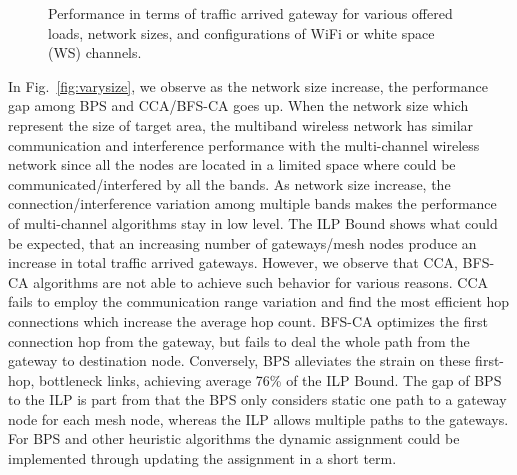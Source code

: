 \begin{figure}[t]
\centering
{}
\hfill
\caption{Performance in terms of traffic arrived gateway for various offered loads, network sizes, and configurations of WiFi or white space (WS) channels.}
\label{fig:all3figs}
\vspace{-0.1in}
\end{figure}

In Fig.~\ref{fig:varysize}, we observe as the network size increase, the performance
gap among BPS and CCA/BFS-CA goes up. When the network size which represent the size 
of target area, the multiband wireless network has similar communication and interference 
performance with the multi-channel wireless network since all the nodes are located in a 
limited space where could be communicated/interfered by all the bands. As network size 
increase, the connection/interference variation among multiple bands makes the performance 
of multi-channel algorithms stay in low level. The ILP Bound shows what could be expected, 
that an increasing number of gateways/mesh nodes produce an increase in total traffic 
arrived gateways. However, we observe that CCA, BFS-CA algorithms are not able to achieve 
such behavior for various reasons. CCA fails to employ the communication range variation 
and find the most efficient hop connections which increase the average hop count. BFS-CA 
optimizes the first connection hop from the gateway, but fails to deal the whole path 
from the gateway to destination node. Conversely, BPS alleviates the strain on these 
first-hop, bottleneck links, achieving average 76\% of the ILP Bound. The gap of BPS 
to the ILP is part from that the BPS only considers static one path to a gateway node for 
each mesh node, whereas the ILP allows multiple paths to the gateways. For BPS and other 
heuristic algorithms the dynamic assignment could be implemented through updating the 
assignment in a short term.

